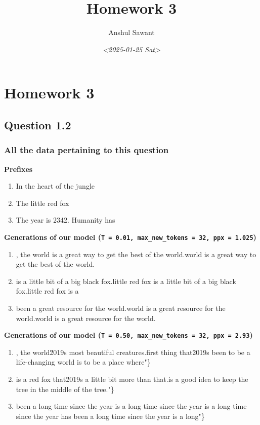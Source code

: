 \documentclass[11pt]{article}
\author{Anshul Sawant}
\date{\textit{<2025-01-25 Sat>}}
\title{Homework 3}
\begin{document}
\maketitle
\tableofcontents

\section{Homework 3}
\label{sec:orge9e43a2}
\subsection{Question 1.2}
\label{sec:org3200c17}
\subsubsection{All the data pertaining to this question}
\label{sec:org8791791}

\textbf{Prefixes}
\begin{enumerate}
\item In the heart of the jungle
\item The little red fox
\item The year is 2342. Humanity has
\end{enumerate}


\textbf{Generations of our model (\texttt{T = 0.01, max\_new\_tokens = 32, ppx = 1.025})}
\begin{enumerate}
\item , the world is a great way to get the best of the world.\nThe world is a great way to get the best of the world.\nThe
\item is a little bit of a big black fox.\nThe little red fox is a little bit of a big black fox.\nThe little red fox is a
\item been a great resource for the world.\nThe world is a great resource for the world.\nThe world is a great resource for the world.\nThe
\end{enumerate}


\textbf{Generations of our model (\texttt{T = 0.50, max\_new\_tokens = 32, ppx = 2.93})}
\begin{enumerate}
\item , the world\u2019s most beautiful creatures.\nThe first thing that\u2019s been to be a life-changing world is to be a place where"\}
\item is a red fox that\u2019s a little bit more than that.\nThis is a good idea to keep the tree in the middle of the tree."\}
\item been a long time since the year is a long time since the year is a long time since the year has been a long time since the year is a long"\}
\end{enumerate}
\end{document}
